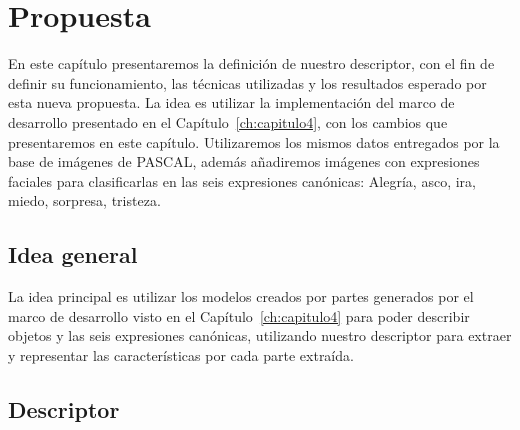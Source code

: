 \chapter[Propuesta]{Propuesta}\label{ch:capitulo5}

En este capítulo presentaremos la definición de nuestro descriptor, con el fin de definir su funcionamiento, las técnicas utilizadas y los resultados esperado por esta nueva propuesta. La idea es utilizar la implementación del marco de desarrollo presentado en el Capítulo~\ref{ch:capitulo4}, con los cambios que presentaremos en este capítulo. Utilizaremos los mismos datos entregados por la base de imágenes de PASCAL, además añadiremos imágenes con expresiones faciales para clasificarlas en las seis expresiones canónicas: Alegría, asco, ira, miedo, sorpresa, tristeza.

\section{Idea general}
La idea principal es utilizar los modelos creados por partes generados por el marco de desarrollo visto en el Capítulo~\ref{ch:capitulo4} para poder describir objetos y las seis expresiones canónicas, utilizando nuestro descriptor para extraer y representar las características por cada parte extraída.
\section{Descriptor}

